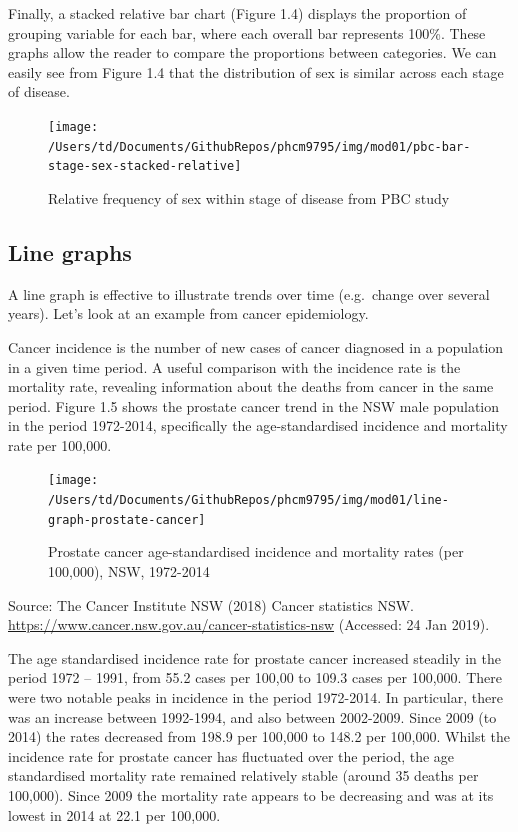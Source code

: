 \documentclass[
]{memoir}
\begin{document}
Finally, a stacked relative bar chart (Figure 1.4) displays the proportion of grouping variable for each bar, where each overall bar represents 100\%. These graphs allow the reader to compare the proportions between categories. We can easily see from Figure 1.4 that the distribution of sex is similar across each stage of disease.

\begin{figure}
\texttt{[image: /Users/td/Documents/GithubRepos/phcm9795/img/mod01/pbc-bar-stage-sex-stacked-relative]} \caption{Relative frequency of sex within stage of disease from PBC study}\label{fig:fig-1-4}
\end{figure}

\hypertarget{line-graphs}{%
\subsection{Line graphs}\label{line-graphs}}

A line graph is effective to illustrate trends over time (e.g.~change over several years). Let's look at an example from cancer epidemiology.

Cancer incidence is the number of new cases of cancer diagnosed in a population in a given time period. A useful comparison with the incidence rate is the mortality rate, revealing information about the deaths from cancer in the same period. Figure 1.5 shows the prostate cancer trend in the NSW male population in the period 1972-2014, specifically the age-standardised incidence and mortality rate per 100,000.

\begin{figure}
\texttt{[image: /Users/td/Documents/GithubRepos/phcm9795/img/mod01/line-graph-prostate-cancer]} \caption{Prostate cancer age-standardised incidence and mortality rates (per 100,000), NSW, 1972-2014}\label{fig:fig-1-5}
\end{figure}

Source: The Cancer Institute NSW (2018) Cancer statistics NSW. \url{https://www.cancer.nsw.gov.au/cancer-statistics-nsw} (Accessed: 24 Jan 2019).

The age standardised incidence rate for prostate cancer increased steadily in the period 1972 -- 1991, from 55.2 cases per 100,00 to 109.3 cases per 100,000. There were two notable peaks in incidence in the period 1972-2014. In particular, there was an increase between 1992-1994, and also between 2002-2009. Since 2009 (to 2014) the rates decreased from 198.9 per 100,000 to 148.2 per 100,000. Whilst the incidence rate for prostate cancer has fluctuated over the period, the age standardised mortality rate remained relatively stable (around 35 deaths per 100,000). Since 2009 the mortality rate appears to be decreasing and was at its lowest in 2014 at 22.1 per 100,000.
\end{document}
